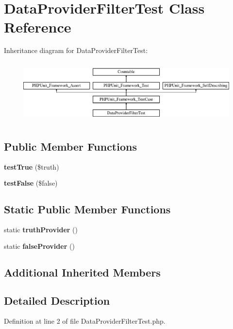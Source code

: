 \section{Data\+Provider\+Filter\+Test Class Reference}
\label{class_data_provider_filter_test}
Inheritance diagram for Data\+Provider\+Filter\+Test\+:\begin{figure}[H]
\begin{center}
\leavevmode
\includegraphics[height=3.303835cm]{class_data_provider_filter_test}
\end{center}
\end{figure}
\subsection*{Public Member Functions}
\begin{DoxyCompactItemize}
\item 
{\bf test\+True} (\$truth)
\item 
{\bf test\+False} (\$false)
\end{DoxyCompactItemize}
\subsection*{Static Public Member Functions}
\begin{DoxyCompactItemize}
\item 
static {\bf truth\+Provider} ()
\item 
static {\bf false\+Provider} ()
\end{DoxyCompactItemize}
\subsection*{Additional Inherited Members}


\subsection{Detailed Description}


Definition at line 2 of file Data\+Provider\+Filter\+Test.\+php.



